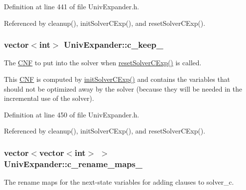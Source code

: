 Definition at line 441 of file Univ\-Expander.\-h.



Referenced by cleanup(), init\-Solver\-C\-Exp(), and reset\-Solver\-C\-Exp().

\hypertarget{classUnivExpander_a048dabb0f36d29d4a709a3f284b60141}{
\subsubsection[{c\-\_\-keep\-\_\-}]{\setlength{\rightskip}{0pt plus 5cm}vector$<$int$>$ Univ\-Expander\-::c\-\_\-keep\-\_\-\hspace{0.3cm}{\ttfamily [protected]}}}\label{classUnivExpander_a048dabb0f36d29d4a709a3f284b60141}


The \hyperlink{classCNF}{C\-N\-F} to put into the solver when \hyperlink{classUnivExpander_a27bb05f7f6a31a700d7407c45aebb6e8}{reset\-Solver\-C\-Exp()} is called. 

This \hyperlink{classCNF}{C\-N\-F} is computed by \hyperlink{classUnivExpander_a909bf44bb238afe91f4bf20416491771}{init\-Solver\-C\-Exp()} and contains the variables that should not be optimized away by the solver (because they will be needed in the incremental use of the solver). 

Definition at line 450 of file Univ\-Expander.\-h.



Referenced by cleanup(), init\-Solver\-C\-Exp(), and reset\-Solver\-C\-Exp().

\hypertarget{classUnivExpander_ad16753edd5e204fac8e8a528f6667c33}{
\subsubsection[{c\-\_\-rename\-\_\-maps\-\_\-}]{\setlength{\rightskip}{0pt plus 5cm}vector$<$vector$<$int$>$ $>$ Univ\-Expander\-::c\-\_\-rename\-\_\-maps\-\_\-\hspace{0.3cm}{\ttfamily [protected]}}}\label{classUnivExpander_ad16753edd5e204fac8e8a528f6667c33}


The rename maps for the next-\/state variables for adding clauses to solver\-\_\-c. 

